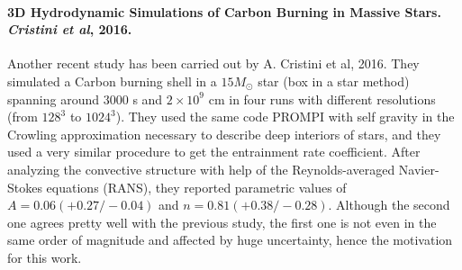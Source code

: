 \paragraph{3D Hydrodynamic Simulations of Carbon Burning in Massive Stars. \textit{Cristini et al}, 2016.} 
Another recent study has been carried out by A. Cristini et al, 2016. They simulated a Carbon burning shell in a $15 M_{\odot}$ star (box in a star method) spanning around $3000$ s and $2 \times 10^9$ cm in four runs with different resolutions (from $128^3$ to $1024^3$). They used the same code PROMPI with self gravity in the Crowling approximation necessary to describe deep interiors of stars, and they used a very similar procedure to get the entrainment rate coefficient. After analyzing the convective structure with help of the Reynolds-averaged Navier-Stokes equations (RANS), they reported parametric values of $A= 0.06 (+0.27 / -0.04)$ and $n= 0.81 (+0.38 / -0.28)$. Although the second one agrees pretty well with the previous study, the first one is not even in the same order of magnitude and affected by huge uncertainty, hence the motivation for this work.
